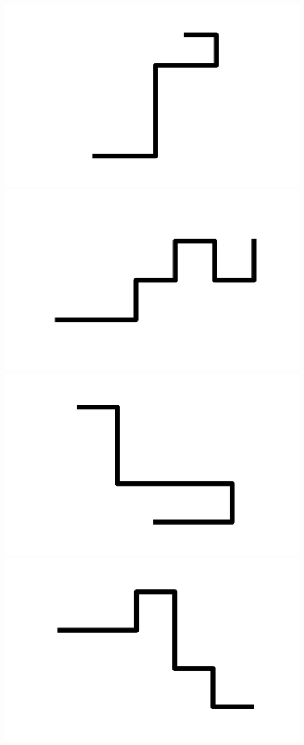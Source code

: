 \documentclass[]{report}
\begin{document}
\includegraphics[scale=.1]{pictures/21/state_cluster_shapes_3.pdf} 
\includegraphics[scale=.1]{pictures/21/state_cluster_shapes_4.pdf} 
\includegraphics[scale=.1]{pictures/21/state_cluster_shapes_5.pdf} 
\includegraphics[scale=.1]{pictures/21/state_cluster_shapes_6.pdf} 
\end{document}
